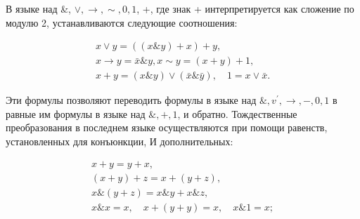 \documentclass[10pt]{article}
\begin{document}
В языке над \&, $\vee, \rightarrow, \sim, 0,1$, +, где знак + интерпретируется как сложение по модулю 2, устанавливаются следующие соотношения:



\[

\begin{gathered}

x \vee y=((x \& y)+x)+y, \\

x \longrightarrow y=\bar{x} \& y, x \sim y=(x+y)+1, \\

x+y=(x \& y) \vee(\bar{x} \& \bar{y}), \quad 1=x \vee \bar{x} .

\end{gathered}

\]



Эти формулы позволяют переводить формулы в языке над $\&, v^{\prime}, \rightarrow,-, 0,1$ в равные им формулы в языке над $\&,+, 1$, и обратно. Тождественные преобразования в последнем языке осуществляются при помощи равенств, установленных для конъюнкции, И дополнительных:



\[

\begin{gathered}

x+y=y+x, \\

(x+y)+z=x+(y+z), \\

x \&(y+z)=x \& y+x \& z, \\

x \& x=x, \quad x+(y+y)=x, \quad x \& 1=x ;

\end{gathered}

\]
\end{document}
